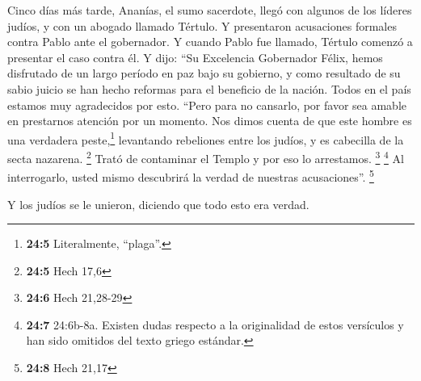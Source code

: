  Cinco días más tarde, Ananías, el sumo sacerdote, llegó
con algunos de los líderes judíos, y con un abogado llamado Tértulo. Y
presentaron acusaciones formales contra Pablo ante el gobernador.
 Y cuando Pablo fue llamado, Tértulo comenzó a presentar
el caso contra él. Y dijo: ``Su Excelencia Gobernador Félix, hemos
disfrutado de un largo período en paz bajo su gobierno, y como resultado
de su sabio juicio se han hecho reformas para el beneficio de la nación.
 Todos en el país estamos muy agradecidos por esto.
 ``Pero para no cansarlo, por favor sea amable en
prestarnos atención por un momento.  Nos dimos cuenta de
que este hombre es una verdadera peste,\footnote{\textbf{24:5}
  Literalmente, ``plaga''.} levantando rebeliones entre los judíos, y es
cabecilla de la secta nazarena. \footnote{\textbf{24:5} Hech 17,6}
 Trató de contaminar el Templo y por eso lo arrestamos.
\footnote{\textbf{24:6} Hech 21,28-29}  \footnote{\textbf{24:7}
  24:6b-8a. Existen dudas respecto a la originalidad de estos versículos
  y han sido omitidos del texto griego estándar.}  Al
interrogarlo, usted mismo descubrirá la verdad de nuestras
acusaciones''. \footnote{\textbf{24:8} Hech 21,17}

 Y los judíos se le unieron, diciendo que todo esto era
verdad.


